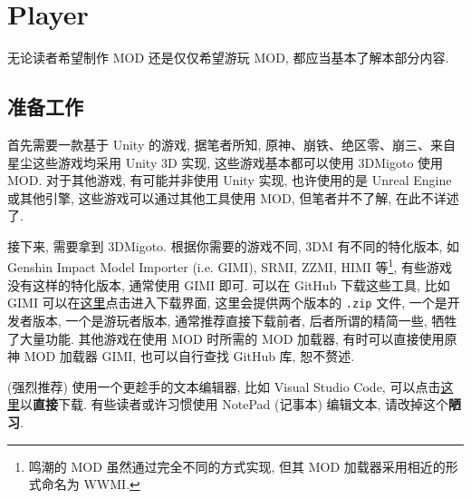 \section{Player}
        无论读者希望制作 MOD 还是仅仅希望游玩 MOD, 都应当基本了解本部分内容.
        \subsection{准备工作}
            \par 首先需要一款基于 Unity 的游戏, 据笔者所知, 原神、崩铁、绝区零、崩三、来自星尘这些游戏均采用 Unity 3D 实现, 这些游戏基本都可以使用 3DMigoto 使用 MOD. 对于其他游戏, 有可能并非使用 Unity 实现, 也许使用的是 Unreal Engine 或其他引擎, 这些游戏可以通过其他工具使用 MOD, 但笔者并不了解, 在此不详述了.
            \par 接下来, 需要拿到 3DMigoto. 根据你需要的游戏不同, 3DM 有不同的特化版本, 如 Genshin Impact Model Importer (i.e. GIMI), SRMI, ZZMI, HIMI 等\footnote{鸣潮的 MOD 虽然通过完全不同的方式实现, 但其 MOD 加载器采用相近的形式命名为 WWMI.}, 有些游戏没有这样的特化版本, 通常使用 GIMI 即可. 可以在 GitHub 下载这些工具, 比如 GIMI 可以在\href{https://github.com/SilentNightSound/GI-Model-Importer/releases/tag/v7.0}{这里}点击进入下载界面, 这里会提供两个版本的 \texttt{.zip} 文件, 一个是开发者版本, 一个是游玩者版本, 通常推荐直接下载前者, 后者所谓的精简一些, 牺牲了大量功能. 其他游戏在使用 MOD 时所需的 MOD 加载器, 有时可以直接使用原神 MOD 加载器 GIMI, 也可以自行查找 GitHub 库, 恕不赘述.
            \par (强烈推荐) 使用一个更趁手的文本编辑器, 比如 Visual Studio Code, 可以点击\href{https://vscode.download.prss.microsoft.com/dbazure/download/stable/384ff7382de624fb94dbaf6da11977bba1ecd427/VSCodeUserSetup-x64-1.94.2.exe}{这里}以\textbf{直接}下载. 有些读者或许习惯使用 NotePad (记事本) 编辑文本, 请改掉这个\textbf{陋习}.

